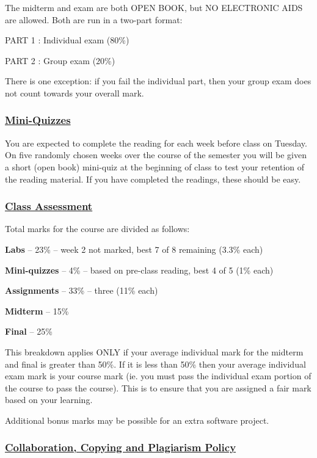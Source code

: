 \documentclass[12pt]{article}
\renewcommand{\section}[1]{\vspace{0pt}\subsubsection*{\underline{\large #1}}\vspace{-10pt}}
\newcounter{lnum}
\newenvironment{abbrevlist}%
  {\begin{list}{ }{\setlength{\leftmargin}{1em}%
               \setlength{\itemindent}{3em}%
               \setlength{\itemsep}{0pt}%
               \setlength{\parsep}{0pt}%
               \setlength{\topsep}{2pt}%
               \usecounter{lnum} } }{\end{list}}
\begin{document}
The midterm and exam are both OPEN BOOK, but NO ELECTRONIC AIDS are allowed. Both are run in a two-part format:
\begin{abbrevlist}
\item[PART 1] : Individual exam (80\%)
\item[PART 2] : Group exam (20\%)
\end{abbrevlist}
There is one exception: if you fail the individual part, then your group exam does not count towards your overall mark.


\section{Mini-Quizzes}

You are expected to complete the reading for each week before class on Tuesday. On five randomly chosen weeks over the course of the semester you will be given a short (open book) mini-quiz at the beginning of class to test your retention of the reading material. If you have completed the readings, these should be easy.

\section{Class Assessment}

Total marks for the course are divided as follows:
\begin{abbrevlist}
\item  {\bf Labs} -- 23\% -- week 2 not marked, best 7 of 8 remaining (3.3\% each)
\item {\bf Mini-quizzes} --  4\% -- based on pre-class reading, best 4 of 5 (1\% each)
\item {\bf Assignments} -- 33\% -- three (11\% each)
\item {\bf Midterm} -- 15\%
\item {\bf Final} -- 25\%
\end{abbrevlist}

This breakdown applies ONLY if your average individual mark for the midterm
and final is greater than 50\%. If it is less than 50\% then your average individual exam mark is your course
mark (ie. you must pass the individual exam portion of the course to pass the course). This is to ensure that 
you are assigned a fair mark based on your learning.

Additional bonus marks may be possible for an extra software project.

\newpage
\section{Collaboration, Copying and Plagiarism Policy}
\end{document}

